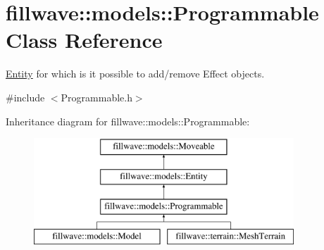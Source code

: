 \hypertarget{classfillwave_1_1models_1_1Programmable}{}\section{fillwave\+:\+:models\+:\+:Programmable Class Reference}
\label{classfillwave_1_1models_1_1Programmable}


\hyperlink{classfillwave_1_1models_1_1Entity}{Entity} for which is it possible to add/remove Effect objects.  




{\ttfamily \#include $<$Programmable.\+h$>$}

Inheritance diagram for fillwave\+:\+:models\+:\+:Programmable\+:\begin{figure}[H]
\begin{center}
\leavevmode
\includegraphics[height=4.000000cm]{classfillwave_1_1models_1_1Programmable}
\end{center}
\end{figure}

